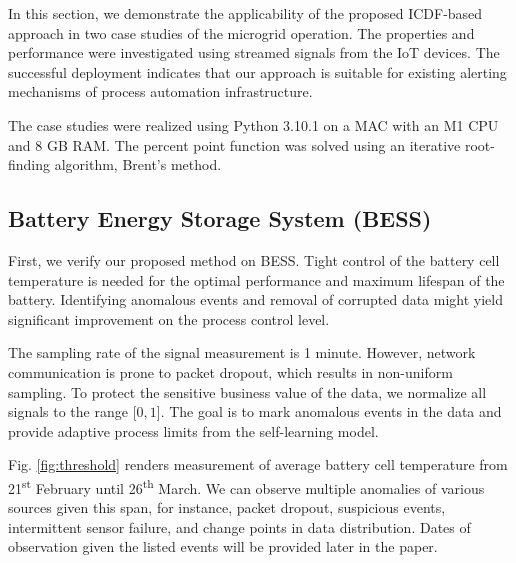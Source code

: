 In this section, we demonstrate the applicability of the proposed ICDF-based approach in two case studies of the microgrid operation. The properties and performance were investigated using streamed signals from the IoT devices. The successful deployment indicates that our approach is suitable for existing alerting mechanisms of process automation infrastructure.

The case studies were realized using Python 3.10.1 on a MAC with an M1 CPU and 8 GB RAM. The percent point function was solved using an iterative root-finding algorithm, Brent's method.

\subsection{Battery Energy Storage System (BESS)}\label{AA:Case1}
First, we verify our proposed method on BESS. Tight control of the battery cell temperature is needed for the optimal performance and maximum lifespan of the battery. Identifying anomalous events and removal of corrupted data might yield significant improvement on the process control level.

The sampling rate of the signal measurement is 1 minute. However, network communication is prone to packet dropout, which results in non-uniform sampling. To protect the sensitive business value of the data, we normalize all signals to the range $[0, 1$]. The goal is to mark anomalous events in the data and provide adaptive process limits from the self-learning model.

Fig. \ref{fig:threshold} renders measurement of average battery cell temperature from 21\textsuperscript{st} February until 26\textsuperscript{th} March. We can observe multiple anomalies of various sources given this span, for instance, packet dropout, suspicious events, intermittent sensor failure, and change points in data distribution. Dates of observation given the listed events will be provided later in the paper.

